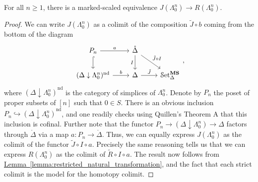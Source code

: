 \documentclass[main.tex]{subfiles}
\begin{document}
\begin{lemma}
  \label{lemma:marked_scaled_equivalence_left_horn}
  For all $n \geq 1$, there is a marked-scaled equivalence $J(\Lambda^{n}_{0}) \to R(\Lambda^{n}_{0})$.
\end{lemma}
\begin{proof}
  We can write $J(\Lambda^{n}_{0})$ as a colimit of the composition $\tilde{J} \circ b$ coming from the bottom of the diagram
  \begin{equation*}
    \begin{tikzcd}
      P_{n}
      \arrow[d, hook]
      \arrow[r, "a"]
      & \mathring{\Delta}
      \arrow[d, swap, "I"]
      \arrow[dr, "\tilde{J} \circ I"]
      \\
      (\Delta \downarrow \Lambda^{n}_{0})^{\mathrm{nd}}
      \arrow[r, "b"]
      & \Delta
      \arrow[r, "\tilde{J}"]
      &\SSetms
    \end{tikzcd},
  \end{equation*}
  where $(\Delta \downarrow \Lambda^{n}_{0})^{\mathrm{nd}}$ is the category of simplices of $\Lambda^{n}_{0}$. Denote by $P_{n}$ the poset of proper subsets of $[n]$ such that $0 \in S$. There is an obvious inclusion $P_{n} \hookrightarrow (\Delta \downarrow \Lambda^{n}_{0})^{\mathrm{nd}}$, and one readily checks using Quillen's Theorem A that this inclusion is cofinal. Further note that the functor $P_{n} \to (\Delta \downarrow \Lambda^{n}_{0}) \to \Delta$ factors through $\mathring{\Delta}$ via a map $a\colon P_{n} \to \mathring{\Delta}$. Thus, we can equally express $J(\Lambda^{n}_{0})$ as the colimit of the functor $\tilde{J} \circ I \circ a$. Precisely the same reasoning tells us that we can express $R(\Lambda^{n}_{0})$ as the colimit of $\tilde{R} \circ I \circ a$. The result now follows from \hyperref[lemma:restricted_natural_transformation]{Lemma~\ref*{lemma:restricted_natural_transformation}}, and the fact that each strict colimit is the model for the homotopy colimit.
\end{proof}
\end{document}
